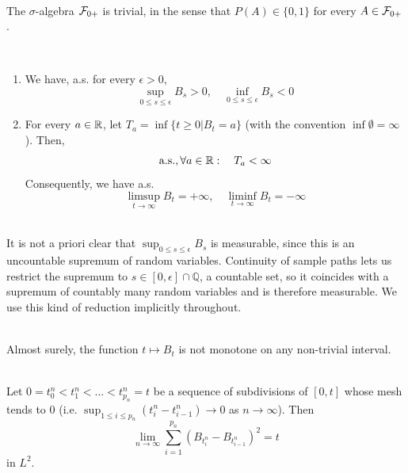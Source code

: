 \begin{theorem} \label{chap2.3:theorem-blumenthal_0_1_law}
 \\
The $\sigma$-algebra $\mathcal{F}_{0+}$ is trivial, in the sense that $P(A)\in \{0,1\}$ for every $A \in \mathcal{F}_{0+}$.
\end{theorem}

\begin{proposition}\label{chap2.3:proposition-sup_inf_and_hitting_times}
 \\
\begin{enumerate}
\item We have, a.s. for every $\epsilon>0$,
    $$\sup_{0 \leq s \leq \epsilon} B_s>0, \quad \inf_{0 \leq s \leq \epsilon} B_s<0$$
\item For every $a \in \mathbb{R}$, let $T_a=\inf\{t \geq 0|B_t=a\}$ (with the convention $\inf\emptyset=\infty$). Then,
$$\mathrm{a.s.}, \forall a \in \mathbb{R}: \quad T_a < \infty$$
Consequently, we have a.s.
$$\limsup_{t \to \infty}B_t=+\infty, \quad \liminf_{t \to \infty}B_t=-\infty$$
\end{enumerate}
\end{proposition}
\begin{remark} \label{chap2.3:remark-measurability_of_sup}  \\
It is not a priori clear that $\sup_{0\le s\le\epsilon}B_s$ is measurable, since this is an uncountable supremum of random variables. Continuity of sample paths lets us restrict the supremum to $s\in[0,\epsilon]\cap\mathbb Q$, a countable set, so it coincides with a supremum of countably many random variables and is therefore measurable. We use this kind of reduction implicitly throughout.
\end{remark}

\begin{corollary}\label{chap2.3:corollary-non_monotone_paths}
 \\
Almost surely, the function $t \mapsto B_t$ is not monotone on any non-trivial interval.
\end{corollary}



\begin{proposition} \label{chap2.3:proposition-quadratic_variation_of_brownian_motion}  \\
Let $0 = t_0^n<t_1^n<...<t_{p_n}^n=t$ be a sequence of subdivisions of $[0,t]$ whose mesh tends to $0$ (i.e. $\sup_{1 \leq i \leq p_n}(t_i^n-t_{i-1}^n) \to 0$ as $n \to \infty$). Then
$$\lim_{n \to \infty} \sum_{i=1}^{p_n}(B_{t_i^n}-B_{t_{i-1}^n})^2=t$$
in $L^2$.
\end{proposition}

